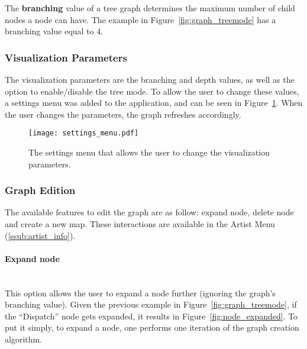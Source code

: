       The \textbf{branching} value of a tree graph determines the maximum number of child nodes a node can have.
      The example in Figure~\ref{fig:graph_treemode} has a branching value equal to 4.


    \subsubsection{Visualization Parameters} %
    \label{ssub:visualization_parameters}
    
    The visualization parameters are the branching and depth values, as well as the option to enable/disable the tree mode.
    To allow the user to change these values, a settings menu was added to the application, and can be seen in Figure~\ref{fig:settings_menu}.
    When the user changes the parameters, the graph refreshes accordingly.

    \begin{figure}[H]
      \begin{center}
        \texttt{[image: settings\_menu.pdf]}
      \end{center}
      \caption{The settings menu that allows the user to change the visualization parameters.}
      \label{fig:settings_menu} 
    \end{figure}


    \subsubsection{Graph Edition} %
      \label{ssub:edition}

      The available features to edit the graph are as follow: expand node, delete node and create a new map.
      These interactions are available in the Artist Menu (\ref{ssub:artist_info}).

      \paragraph{Expand node} \hfill \\
      This option allows the user to expand a node further (ignoring the graph's branching value).
      Given the previous example in Figure~\ref{fig:graph_treemode}, if the ``Dispatch'' node gets expanded, it results in Figure~\ref{fig:node_expanded}.
      To put it simply, to expand a node, one performs one iteration of the graph creation algorithm.

